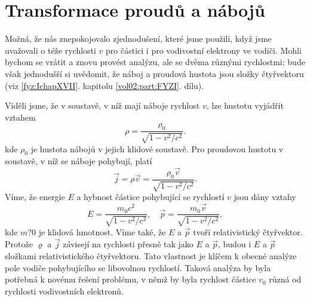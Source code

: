   \section{Transformace proudů a nábojů}\label{fyz:IIchapXIIIsecVII}
    Možná, že nás znepokojovalo zjednodušení, které jsme použili, když jsme uvažovali o téže
    rychlosti \(v\) pro částici i pro vodivostní elektrony ve vodiči. Mohli bychom se vrátit a znovu
    provést analýzu, ale se dvěma různými rychlostmi; bude však jednodušší si uvědomit, že náboj a
    proudová hustota jsou složky čtyřvektoru (viz \ref{fyz:IchapXVII}. kapitolu \ref{vol02:part:FYZI}.
    dílu). 
    
    Viděli jsme, že v soustavě, v níž mají náboje rychlost \(v\), lze hustotu vyjádřit vztahem
    \begin{equation*}
      ρ=\dfrac{ρ_0}{\sqrt{1−v^2/c^2}}.
    \end{equation*}
    kde \(ρ_0\) je hustota nábojů v jejich klidové soustavě. Pro proudovou hustotu v soustavě, v níž
    se náboje pohybují, platí
    \begin{equation}\label{fyz:eq890}
      \vec{j}=ρ\vec{v}=\dfrac{ρ_0\vec{v}}{\sqrt{1−v^2/c^2}}.
    \end{equation}
    Víme, že energie \(E\) a hybnost částice pohybující se rychlostí \(v\) jsou dány vztahy
    \begin{equation*}
      E=\dfrac{m_0c^2}{\sqrt{1−v^2/c^2}}, \quad \vec{p}=\dfrac{m_0\vec{v}}{\sqrt{1−v^2/c^2}},
    \end{equation*}
    kde \(m?0\) je klidová hmotnost. Víme také, že \(E\) a \(\vec{p}\) tvoří relativistický
    čtyřvektor. Protože \(\varrho\) a \(\vec{j}\) závisejí na rychlosti přesně tak jako \(E\) a
    \(\vec{p}\), budou i \(E\) a \(\vec{p}\) složkami relativistického čtyřvektoru. Tato vlastnost
    je klíčem k obecné analýze pole vodiče pohybujícího se libovolnou rychlostí. Taková analýza by
    byla potřebná k novému řešení problému, v němž by byla rychlost částice \(v_0\) různá od
    rychlosti vodivostních elektronů.

